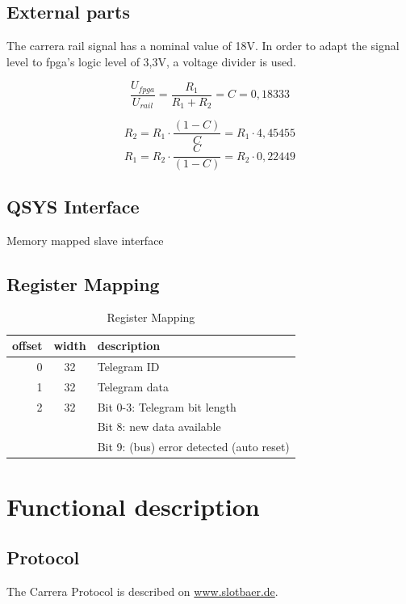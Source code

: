 \documentclass {scrartcl}
\begin{document}
\subsection{External parts}
The carrera rail signal has a nominal value of 18V. In order to adapt the signal level to fpga's logic level of 3{,}3V, a voltage divider is used.

$$ \frac{U_{fpga}}{U_{rail}} = \frac{R_1}{R_1+R_2} = C = 0,18333$$

$$ R_2 = R_1 \cdot \frac{(1-C)}{C} = R_1 \cdot 4{,}45455 $$
$$ R_1 = R_2 \cdot \frac{C}{(1-C)} = R_2 \cdot 0{,}22449$$

\subsection{QSYS Interface}
Memory mapped slave interface
\subsection{Register Mapping}
\begin{table}[h]
	\centering
		\begin{tabular}{|r|c|l|}
				\hline
		offset & width & description \\
		\hline
		\hline
		0 & 32 & Telegram ID \\
		\hline
		1 & 32 & Telegram data\\
		\hline
		2 & 32 & Bit 0-3: Telegram bit length \\
		  & & Bit 8: new data available\\
			& & Bit 9: (bus) error detected (auto reset)\\
		\hline	
		\end{tabular}
	\caption{Register Mapping}
	\label{tab:RegisterMapping}
\end{table}

\section{Functional description}
\subsection{Protocol}
The Carrera Protocol is described on \href{http://www.slotbaer.de/index.php/carrera-digital-124-132/12-d132-d124-daten-protokoll}{www.slotbaer.de}.
\end{document}
